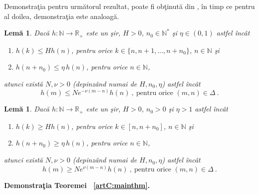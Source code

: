 \documentclass[ a4paper, 12pt]{report}
\newcommand{\R}{\mathbb{R}}
\newcommand{\N}{\mathbb{N}}
\newtheorem{lema}[theorem]{\bf{Lem\u a}}
\theoremstyle{definition}
\theoremstyle{remark}
\numberwithin{equation}{section}
\begin{document}
Demonstra\c tia pentru urm\u atorul rezultat, poate fi ob\c tinut\u a din \cite[20C, p.39]{MasseraSchaffer}, \^in timp ce pentru al doilea, demonstra\c tia este analoag\u a.

\begin{lema}
\label{artC:lemma1:stability}
Dac\u a $h:\N\to\R_+$ este un \c sir, $H>0$, $n_0\in\N^*$ \c si $\eta\in(0,1)$ astfel \^inc\^at
\begin{enumerate}
\item[(i)] $h(k)\leq H h(n)$, pentru orice $k\in\{n,n+1,...,n+n_0\}$, $n\in\N$ \c si
\item[(ii)] $h(n+n_0)\leq\eta\,h(n)$, pentru orice $n\in\N$,
\end{enumerate}
atunci exist\u a $N,\nu>0$ (depinz\^and numai de $H,n_0,\eta$) astfel \^inc\^at
$$h(m)\leq Ne^{-\nu(m-n)}h(n)\ ,\ \text{pentru orice } (m,n)\in\Delta\ .$$
\end{lema}

\begin{lema}
\label{artC:lemma2:blowup}
Dac\u a $h:\N\to\R_+$ este un \c sir, $H>0$, $n_0>0$ \c si $\eta>1$ astfel \^inc\^at
\begin{enumerate}
\item[(i)] $h(k)\geq H h(n)$, pentru orice $k\in[n,n+n_0]$, $n\in\N$ \c si
\item[(ii)] $h(n+n_0)\geq\eta\,h(n)$, pentru orice $n\in\N$,
\end{enumerate}
atunci exist\u a $N,\nu>0$ (depinz\^and numai de $H,n_0,\eta$) astfel \^inc\^at
$$h(m)\geq Ne^{\nu(m-n)}h(n)\ ,\ \text{pentru orice } (m,n)\in\Delta\ .$$
\end{lema}


\noindent
\textbf{ Demonstra\c tia Teoremei ~\ref{artC:mainthm}.}
\medskip
\end{document}

